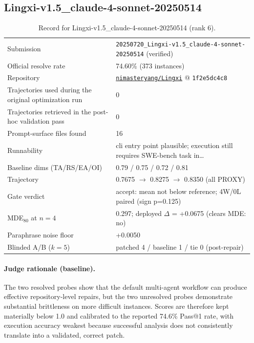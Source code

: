 \subsection{Lingxi-v1.5\_claude-4-sonnet-20250514}
\label{app:agent6}
\begin{table}[h]\centering\scriptsize
\caption{Record for Lingxi-v1.5\_claude-4-sonnet-20250514 (rank 6).}
\begin{tabular}{lp{8.2cm}}\toprule
Submission & \texttt{20250720\_\allowbreak{}Lingxi-v1.5\_\allowbreak{}claude-4-sonnet-20250514} (verified) \\
Official resolve rate & 74.60\% (373 instances) \\
Repository & \href{https://github.com/nimasteryang/Lingxi}{\texttt{nimasteryang/Lingxi}} @ \texttt{1f2e5dc4c8} \\
Trajectories used during the original optimization run & 0 \\
Trajectories retrieved in the post-hoc validation pass & 0 \\
Prompt-surface files found & 16 \\
Runnability & cli entry point plausible; execution still requires SWE-bench task in\ldots{} \\
Baseline dims (TA/RS/EA/OI) & 0.79 / 0.75 / 0.72 / 0.81 \\
Trajectory & 0.7675 $\to$ 0.8275 $\to$ 0.8350 (all PROXY) \\
Gate verdict & accept: mean not below reference; 4W/0L paired (sign p=0.125) \\
MDE$_{80}$ at $n{=}4$ & 0.297; deployed $\Delta$ = +0.0675 (clears MDE: no) \\
Paraphrase noise floor & +0.0050 \\
Blinded A/B ($k{=}5$) & patched 4 / baseline 1 / tie 0 (post-repair) \\
\bottomrule\end{tabular}\end{table}
\paragraph{Judge rationale (baseline).}
The two resolved probes show that the default multi-agent workflow can produce effective repository-level repairs, but the two unresolved probes demonstrate substantial brittleness on more difficult instances. Scores are therefore kept materially below 1.0 and calibrated to the reported 74.6\% Pass@1 rate, with execution accuracy weakest because successful analysis does not consistently translate into a validated, correct patch.
